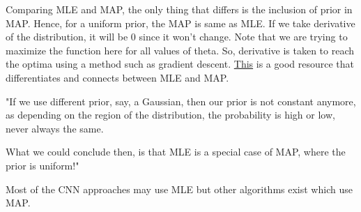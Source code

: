 Comparing MLE and MAP, the only thing that differs is the inclusion of prior in MAP. Hence, for a uniform prior, the MAP is same as MLE. If we take derivative of the distribution, it will be 0 since it won't change. Note that we are trying to maximize the function here for all values of theta. So, derivative is taken to reach the optima using a method such as gradient descent. \href{https://wiseodd.github.io/techblog/2017/01/01/mle-vs-map/}{This} is a good resource that differentiates and connects between MLE and MAP.

"If we use different prior, say, a Gaussian, then our prior is not constant anymore, as depending on the region of the distribution, the probability is high or low, never always the same.

What we could conclude then, is that MLE is a special case of MAP, where the prior is uniform!"

Most of the CNN approaches may use MLE but other algorithms exist which use MAP. 